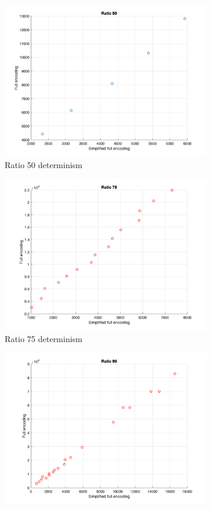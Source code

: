  
\begin{figure}[h]
\centering
\begin{subfigure}{0.32\textwidth}
\includegraphics[width=0.9\linewidth]{pic/r50_determinism.png}
\caption{Ratio 50 determinism}
\label{fig: r50_determin}
\end{subfigure}
\begin{subfigure}{0.32\textwidth}
\includegraphics[width=0.9\linewidth]{pic/r75_determinism.png}
\caption{Ratio 75 determinism}
\label{fig: r75_determin}
\end{subfigure}
\begin{subfigure}{0.32\textwidth}
\includegraphics[width=0.9\linewidth]{pic/r90_determism.png}

\end{subfigure}
\end{figure}
